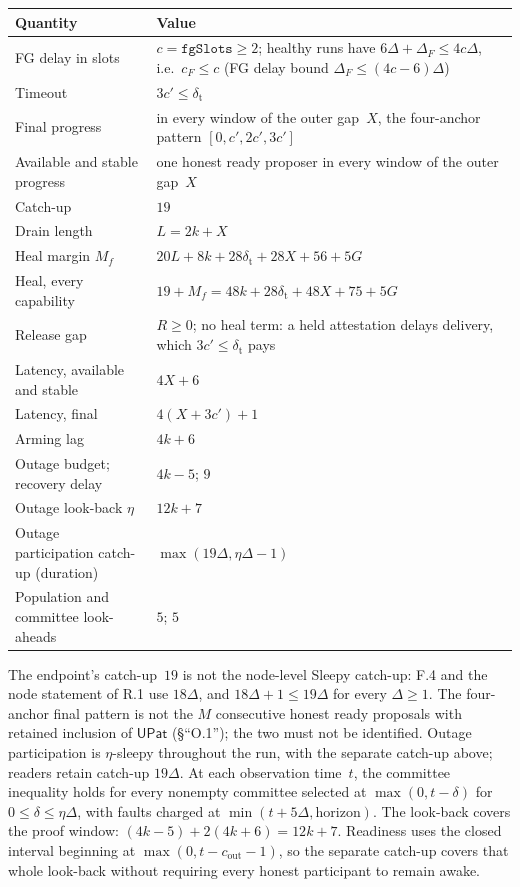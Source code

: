 \documentclass{article}
\newcommand{\cF}{c_F}
\begin{document}
\begin{center}\footnotesize
\begin{tabular}{@{}>{\raggedright\arraybackslash}p{4.6cm}>{\raggedright\arraybackslash}p{8.4cm}@{}}
\hline
Quantity & Value\\
\hline
FG delay in slots & $c=\texttt{fgSlots}\geq2$; healthy runs have $6\Delta+\Delta_F\leq4c\Delta$, i.e.\ $\cF\leq c$ (FG delay bound $\Delta_F\leq(4c-6)\Delta$)\\
Timeout & $3c'\leq\delta_{\mathrm t}$\\
Final progress & in every window of the outer gap~$X$, the four-anchor
  pattern $[0,c',2c',3c']$\\
Available and stable progress & one honest ready proposer in every window of
  the outer gap~$X$\\
Catch-up & $19$\\
Drain length & $L=2k+X$\\
Heal margin $M_f$ & $20L+8k+28\delta_{\mathrm t}+28X+56+5G$\\
Heal, every capability & $19+M_f=48k+28\delta_{\mathrm t}+48X+75+5G$\\
Release gap & $R\geq0$; no heal term: a held attestation delays delivery,
  which $3c'\leq\delta_{\mathrm t}$ pays\\
Latency, available and stable & $4X+6$\\
Latency, final & $4(X+3c')+1$\\
Arming lag & $4k+6$\\
Outage budget; recovery delay & $4k-5$; $9$\\
Outage look-back $\eta$ & $12k+7$\\
Outage participation catch-up (duration) & $\max(19\Delta,\eta\Delta-1)$\\
Population and committee look-aheads & $5$; $5$\\
\hline
\end{tabular}
\end{center}
The endpoint's catch-up~$19$ is not the node-level Sleepy catch-up: F.4 and
the node statement of R.1 use $18\Delta$, and $18\Delta+1\leq19\Delta$ for
every $\Delta\geq1$.  The four-anchor final pattern is not the $M$
consecutive honest ready proposals with retained inclusion of
$\mathsf{UPat}$ (\S``O.1''); the two must not be identified.
Outage participation is $\eta$-sleepy throughout the run, with the separate
catch-up above; readers retain catch-up $19\Delta$. At each observation time~$t$,
the committee inequality holds for every nonempty committee selected at
$\max(0,t-\delta)$ for $0\leq\delta\leq\eta\Delta$, with faults charged at
$\min(t+5\Delta,\mathrm{horizon})$. The look-back covers the proof window:
$(4k-5)+2(4k+6)=12k+7$. Readiness uses the closed interval beginning at
$\max(0,t-c_{\mathrm{out}}-1)$, so the separate catch-up covers that whole
look-back without requiring every honest participant to remain awake.
\end{document}
